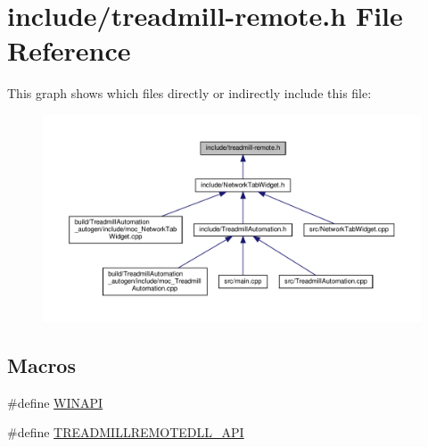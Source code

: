 \hypertarget{treadmill-remote_8h}{}\section{include/treadmill-\/remote.h File Reference}
\label{treadmill-remote_8h}
This graph shows which files directly or indirectly include this file\+:
\nopagebreak
\begin{figure}[H]
\begin{center}
\leavevmode
\includegraphics[width=350pt]{treadmill-remote_8h__dep__incl}
\end{center}
\end{figure}
\subsection*{Macros}
\begin{DoxyCompactItemize}
\item 
\#define \hyperlink{treadmill-remote_8h_a9aa60e1ead64be77ad551e745cbfd4d3}{W\+I\+N\+A\+PI}
\item 
\#define \hyperlink{treadmill-remote_8h_a227455497d4d32bfe49f1f795b27c6cc}{T\+R\+E\+A\+D\+M\+I\+L\+L\+R\+E\+M\+O\+T\+E\+D\+L\+L\+\_\+\+A\+PI}
\end{DoxyCompactItemize}
